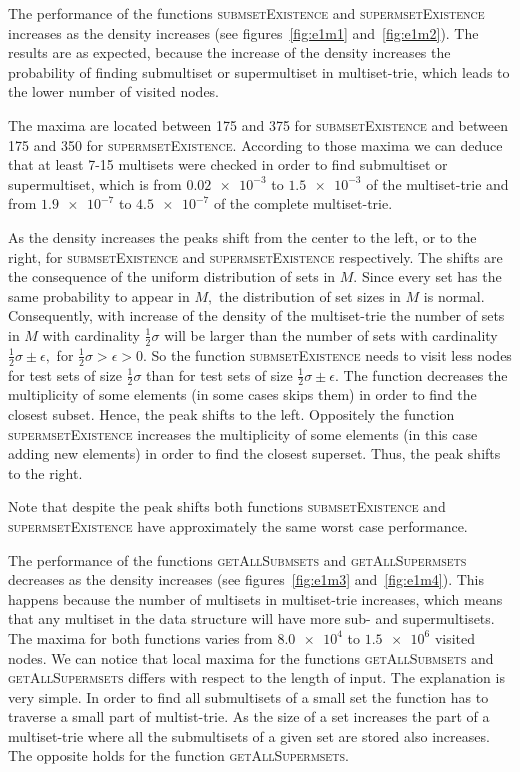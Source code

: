 The performance of the functions \textsc{submsetExistence} and 
\textsc{supermsetExistence} increases as the density increases (see figures~\ref{fig:e1m1}
and~\ref{fig:e1m2}). The results are as expected, because the increase of the 
density increases the probability of finding submultiset or supermultiset in 
multiset-trie, which leads to the lower number of visited nodes. 

The maxima are located between 175 and 375 for \textsc{submsetExistence} and 
between 175 and 350 for \textsc{supermsetExistence}. According to those maxima 
we can deduce that at least 7-15 multisets were checked in order to find 
submultiset or supermultiset, which is from $\num{0.02e-3}$ to $\num{1.5e-3}$ of the 
multiset-trie and from $\num{1.9e-7}$ to $\num{4.5e-7}$ of the complete 
multiset-trie.

As the density increases the peaks shift from the center to the left, or to the right, 
for \textsc{submsetExistence} and \textsc{supermsetExistence} respectively. 
The shifts are the consequence of the uniform distribution of sets in $M.$ 
Since every set has the same probability to appear in $M,$ the distribution of set 
sizes in $M$ is normal. Consequently, with increase of the density of the 
multiset-trie the number of sets in $M$ with cardinality $\frac{1}{2}\sigma$ will be 
larger than the number of sets with cardinality $\frac{1}{2}\sigma\pm\epsilon,$ 
for $\frac{1}{2}\sigma > \epsilon > 0.$ So the function \textsc{submsetExistence} 
needs to visit less nodes for test sets of size $\frac{1}{2}\sigma$ than for test 
sets of size $\frac{1}{2}\sigma\pm\epsilon.$ The function decreases the 
multiplicity of some elements (in some cases skips them) in order to find the 
closest subset. Hence, the peak shifts to the left. Oppositely the function 
\textsc{supermsetExistence} increases the multiplicity of some elements 
(in this case adding new elements) in order to find the closest superset. 
Thus, the peak shifts to the right.

Note that despite the peak shifts both functions \textsc{submsetExistence} and 
\textsc{supermsetExistence} have approximately the same worst case performance. 

The performance of the functions \textsc{getAllSubmsets} and \textsc{getAllSupermsets} 
decreases as the density increases (see figures~\ref{fig:e1m3} and~\ref{fig:e1m4}). 
This happens because the number of multisets in multiset-trie increases, which means 
that any multiset in the data structure will have more sub- and supermultisets. 
The maxima for both functions varies from $\num{8.0e4}$ to $\num{1.5e6}$ visited nodes. 
We can notice that local maxima for the functions \textsc{getAllSubmsets} and 
\textsc{getAllSupermsets} differs with respect to the length of input. The 
explanation is very simple. In order to find all submultisets of a small set the 
function has to traverse a small part of multist-trie. As the size of a set 
increases the part of a multiset-trie where all the submultisets of a given set 
are stored also increases. The opposite holds for the function 
\textsc{getAllSupermsets}.


